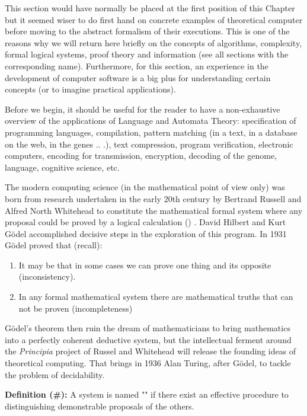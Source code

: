 	\begin{tcolorbox}[title=Remark,colframe=black,arc=10pt]
	This section would have normally be placed at the first position of this Chapter but it seemed wiser to do first hand on concrete examples of theoretical computer before moving to the abstract formalism of their executions. This is one of the reasons why we will return here briefly on the concepts of algorithms, complexity, formal logical systems, proof theory and information (see all sections with the corresponding name). Furthermore, for this section, an experience in the development of computer software is a big plus for understanding certain concepts (or to imagine practical applications).
	\end{tcolorbox}
	Before we begin, it should be useful for the reader to have a non-exhaustive overview of the applications of Language and Automata Theory: specification of programming languages, compilation, pattern matching (in a text, in a database on the web, in the genes .. .), text compression, program verification, electronic computers, encoding for transmission, encryption, decoding of the genome, language, cognitive science, etc.
	
	The modern computing science (in the mathematical point of view only) was born from research undertaken in the early 20th century by Bertrand Russell and Alfred North Whitehead to constitute the mathematical formal system where any proposal could be proved by a logical calculation () . David Hilbert and Kurt Gödel accomplished decisive steps in the exploration of this program. In 1931 Gödel proved that (recall):
	\begin{enumerate}
		\item It may be that in some cases we can prove one thing and its opposite (inconsistency).
	
		\item In any formal mathematical system there are mathematical truths that can not be proven (incompleteness)
	\end{enumerate}
	Gödel's theorem then  ruin the dream of mathematicians to bring mathematics into a perfectly coherent deductive system, but the intellectual ferment around the \textit{Principia} project of Russel and Whitehead will release the founding ideas of theoretical computing. That brings in 1936 Alan Turing, after Gödel, to tackle the problem of decidability.
	
	\textbf{Definition (\#\mydef):} A system is named "" if there exist an effective procedure to distinguishing demonstrable proposals of the others. 

